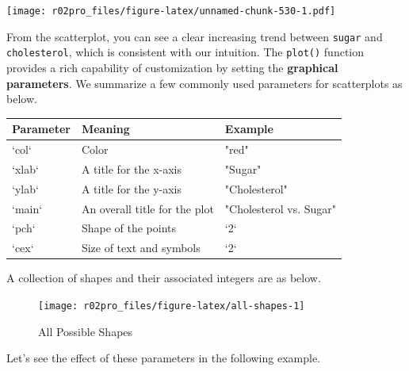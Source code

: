 \documentclass[
]{book}
\newenvironment{Shaded}{\begin{snugshade}}{\end{snugshade}}
\newcommand{\AttributeTok}[1]{\textcolor[rgb]{0.77,0.63,0.00}{#1}}
\newcommand{\DecValTok}[1]{\textcolor[rgb]{0.00,0.00,0.81}{#1}}
\newcommand{\FunctionTok}[1]{\textcolor[rgb]{0.00,0.00,0.00}{#1}}
\newcommand{\NormalTok}[1]{#1}
\newcommand{\SpecialCharTok}[1]{\textcolor[rgb]{0.00,0.00,0.00}{#1}}
\newcommand{\StringTok}[1]{\textcolor[rgb]{0.31,0.60,0.02}{#1}}
\newenvironment{blackbox}{
  \definecolor{shadecolor}{rgb}{0, 0, 0}  %
  \color{white}
  \begin{shaded}}
 {\end{shaded}}
\newenvironment{infobox}[1]
  {
  \begin{itemize}
  \renewcommand{\labelitemi}{
    \raisebox{-.7\height}[0pt][0pt]{
      {\setkeys{Gin}{width=3em,keepaspectratio}
        \texttt{[image: pics/\#1]}}
    }
  }
  \setlength{\fboxsep}{1em}
  \begin{blackbox}
  \item
  }
  {
  \end{blackbox}
  \end{itemize}
  }
\begin{document}
\texttt{[image: r02pro\_files/figure-latex/unnamed-chunk-530-1.pdf]}

From the scatterplot, you can see a clear increasing trend between \texttt{sugar} and \texttt{cholesterol}, which is consistent with our intuition. The \texttt{plot()} function provides a rich capability of customization by setting the \textbf{graphical parameters}. We summarize a few commonly used parameters for scatterplots as below.

\begin{tabular}{l|l|l}
\hline
Parameter & Meaning & Example\\
\hline
`col` & Color & "red"\\
\hline
`xlab` & A title for the x-axis & "Sugar"\\
\hline
`ylab` & A title for the y-axis & "Cholesterol"\\
\hline
`main` & An overall title for the plot & "Cholesterol vs. Sugar"\\
\hline
`pch` & Shape of the points & `2`\\
\hline
`cex` & Size of text and symbols & `2`\\
\hline
\end{tabular}

\begin{infobox}{caution}

A collection of shapes and their associated integers are as below.

\begin{figure}

{\centering \texttt{[image: r02pro\_files/figure-latex/all-shapes-1]} 

}

\caption{All Possible Shapes}\label{fig:all-shapes}
\end{figure}

\end{infobox}

Let's see the effect of these parameters in the following example.

\begin{Shaded}
\end{Shaded}
\end{document}
